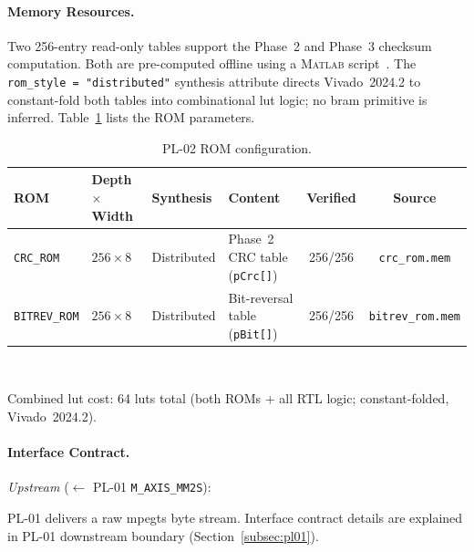 
\FloatBarrier
\paragraph{Memory Resources.}
Two 256-entry read-only tables support the Phase~2 and Phase~3 checksum
computation.
Both are pre-computed offline using a \textsc{Matlab} script~\cite{ITU_J83}.
The \texttt{rom\_style = "distributed"} synthesis attribute directs
Vivado~2024.2 to constant-fold both tables into combinational \ac{lut}
logic; no \ac{bram} primitive is inferred.
Table~\ref{tab:pl02_roms} lists the ROM parameters.

\begin{table}[htbp]
  \caption{PL-02 ROM configuration.}
  \label{tab:pl02_roms}
  \centering
  \small
  \begin{tabular}{llllcc}
    \hline
    ROM                  & Depth$\times$Width & Synthesis   & Content                              & Verified & Source \\
    \hline
    \texttt{CRC\_ROM}    & $256 \times 8$     & Distributed & Phase~2 CRC table (\texttt{pCrc[]})  & 256/256  & \texttt{crc\_rom.mem} \\[2pt]
    \texttt{BITREV\_ROM} & $256 \times 8$     & Distributed & Bit-reversal table (\texttt{pBit[]}) & 256/256  & \texttt{bitrev\_rom.mem} \\
    \hline
  \end{tabular}\\[4pt]
  \begin{minipage}{\linewidth}
    \small
    Combined \ac{lut} cost: 64 \acp{lut} total (both ROMs + all RTL logic;
    constant-folded, Vivado~2024.2).
  \end{minipage}
\end{table}


\FloatBarrier
\paragraph{Interface Contract.}

\textit{Upstream} ($\leftarrow$ PL-01 \texttt{M\_AXIS\_MM2S}):
\begin{tightemize}
  \item PL-01 delivers a raw \ac{mpegts} byte stream. Interface contract
        details are explained in PL-01 downstream boundary
        (Section~\ref{subsec:pl01}).
\end{tightemize}

